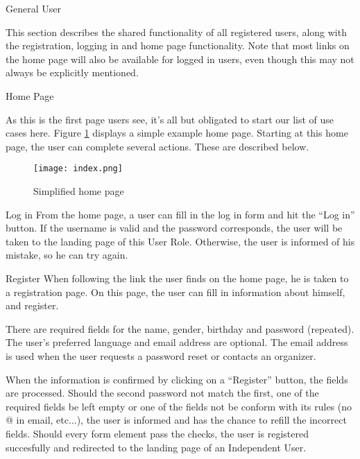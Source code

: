 
\begin{section}{General User}

    This section describes the shared functionality of all registered users,
    along with the registration, logging in and home page functionality. Note
    that most links on the home page will also be available for logged in users,
    even though this may not always be explicitly mentioned.

    \begin{subsection}{Home Page}

        As this is the first page users see, it's all but obligated to start our
        list of use cases here. Figure \ref{img:index} displays a simple example
        home page. Starting at this home page, the user can complete several
        actions. These are described below.

        \begin{figure}[h]
            \centering
            \texttt{[image: index.png]}
            \caption{Simplified home page}
            \label{img:index}
        \end{figure}

        \begin{subsubsection}{Log in}
            From the home page, a user can fill in the log in form and hit the
            ``Log in'' button. If the username is valid and the password
            corresponds, the user will be taken to the landing page of this User
            Role. Otherwise, the user is informed of his mistake, so he can try
            again.
        \end{subsubsection}

        \begin{subsubsection}{Register}
            When following the link the user finds on the home page, he is taken
            to a registration page. On this page, the user can fill in
            information about himself, and register.

            There are required fields for the name, gender, birthday and
            password (repeated). The user's preferred language and
            email address are optional. The email address is used when the user
            requests a password reset or contacts an organizer.

            When the information is confirmed by clicking on a ``Register''
            button, the fields are processed. Should the second password not
            match the first, one of the required fields be left empty or one of
            the fields not be conform with its rules (no @ in email, etc...), the
            user is informed and has the chance to refill the incorrect fields.
            Should every form element pass the checks, the user is registered
            succesfully and redirected to the landing page of an Independent
            User.


\end{subsubsection}
\end{subsection}
\end{section}
